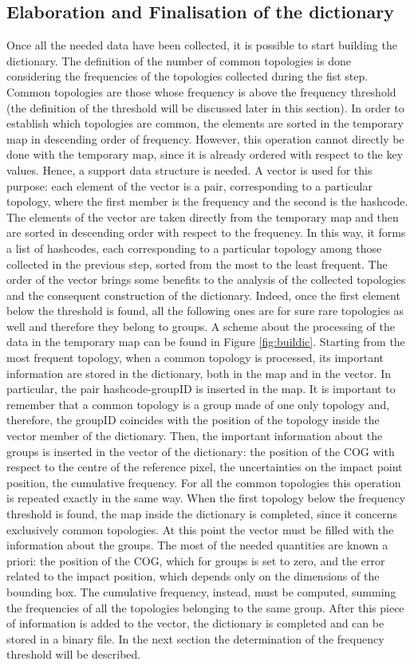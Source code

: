 \subsection{Elaboration and Finalisation of the dictionary}
Once all the needed data have been collected, it is possible to start building the dictionary. The definition of  the number of common topologies is done considering the frequencies of the topologies collected during the fist step. Common topologies are those whose frequency is above the frequency threshold (the definition of the threshold will be discussed later in this section). In order to establish which topologies are common, the elements are sorted in the temporary map in descending order of frequency. However, this operation cannot directly be done with the temporary map, since it is already ordered with respect to the key values. Hence, a support data structure is needed. A vector is used for this purpose: each element of the vector is a pair, corresponding to a particular topology, where the first member is the frequency and the second is the hashcode. The elements of the vector are taken directly from the temporary map and then are sorted in descending order with respect to the frequency. In this way, it forms a list of hashcodes, each corresponding to a particular topology among those collected in the previous step, sorted from the most to the least frequent. The order of the vector brings some benefits to the analysis of the collected topologies and the consequent construction of the dictionary. Indeed, once the first element below the threshold is found, all the following ones are for sure rare topologies as well and therefore they belong to groups. A scheme about the processing of the data in the temporary map can be found in Figure \ref{fig:buildic}.
Starting from the most frequent topology, when a common topology is processed, its important information are stored in the dictionary, both in the map and in the vector. In particular, the pair hashcode-groupID is inserted in the map. It is important to remember that a common topology is a group made of one only topology and, therefore, the groupID coincides with the position of the topology inside the vector member of the dictionary. Then, the important information about the groups is inserted in the vector of the dictionary: the position of the COG with respect to the centre of the reference pixel, the uncertainties on the impact point position, the cumulative frequency. For all the common topologies this operation is repeated exactly in the same way. When the first topology below the frequency threshold is found, the map inside the dictionary is completed, since it concerns exclusively common topologies. At this point the vector must be filled with the information about the groups. The most of the needed quantities are known a priori: the position of the COG, which for groups is set to zero, and the error related to the impact position, which depends only on the dimensions of the bounding box. The cumulative frequency, instead, must be computed, summing the frequencies of all the topologies belonging to the same group. After this piece of information is added to the vector, the dictionary is completed and can be stored in a binary file. In the next section the determination of the frequency threshold will be described.
